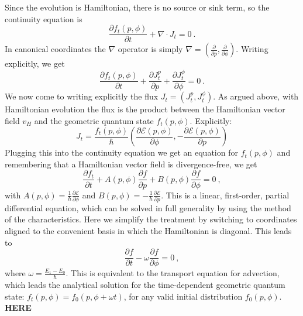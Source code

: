 \documentclass[draft,nofootinbib,pre,twocolumn,showpacs,showkeys,preprintnumbers,floatfix]{revtex4-1}
\newcommand{\1}{\mathbbm{1}}
\newcommand{\p}{\partial}
\begin{document}
Since the evolution is Hamiltonian, there is no source or sink term, so the continuity equation is 
\begin{equation}
\frac{\partial f_t(p,\phi)}{\partial t} + \nabla \cdot J_t = 0~.
\end{equation}
In canonical coordinates the $\nabla$ operator is simply $\nabla = (\frac{\p }{\p p},\frac{\p }{\p \phi})$.
Writing explicitly, we get
\begin{equation}
\frac{\partial f_t(p,\phi)}{\partial t} + \frac{\p J_t^p}{\p p} + \frac{\p J_t^{\phi}}{\p \phi} = 0~.
\end{equation}
We now come to writing explicitly the flux $J_t = (J_t^p,J_t^{\phi})$. As argued above, 
with Hamiltonian evolution the flux is the product between the Hamiltonian vector 
field $v_H$ and the geometric quantum state $f_t(p,\phi)$. Explicitly:
\begin{equation}
J_t =  \frac{f_t(p,\phi)}{\hbar} \left(\frac{\p \mathcal{E}(p,\phi)}{\p \phi}, -\frac{\p \mathcal{E}(p,\phi)}{\p p}\right)
\end{equation}
Plugging this into the continuity equation we get an equation for $f_t(p,\phi)$ and remembering
that a Hamiltonian vector field is divergence-free, we get
\begin{equation}
\frac{\partial f_t}{\partial t} + A(p,\phi) \frac{\partial f}{\partial p} + B(p,\phi) \frac{\partial f}{\partial \phi} = 0~,
\end{equation}
with $A(p,\phi) = \frac{1}{\hbar}\frac{\partial \mathcal{E}}{\partial \phi}$ and $B(p,\phi) = - \frac{1}{\hbar}\frac{\partial \mathcal{E}}{\partial p}$.
This is a linear, first-order, partial differential equation, which can be solved 
in full generality by using the method of the characteristics. Here we simplify the treatment 
by switching to coordinates aligned to the convenient basis in which the Hamiltonian 
is diagonal. This leads to
\begin{equation}
\frac{\partial f}{\partial t} - \omega \frac{\partial f}{\partial \phi} = 0~,
\end{equation}
where $\omega = \frac{E_1 - E_0}{\hbar}$. This is equivalent to the transport 
equation for advection, which leads the analytical solution for the time-dependent
geometric quantum state: $f_t(p,\phi) = f_0(p,\phi+\omega t)$, for any valid initial 
distribution $f_0(p,\phi)$.\\

{\bf HERE}
\end{document}
